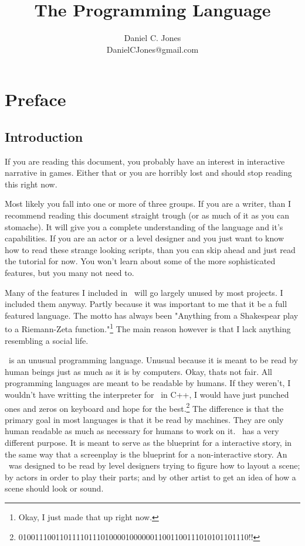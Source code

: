 \documentclass{book}
\title{The \textcolor{TitleRed}{\SSquared} Programming Language}
\author{Daniel C. Jones\\DanielCJones@gmail.com}
\begin{document}
%
%

\maketitle

%
%

\tableofcontents


%
%

\chapter{Preface}


\section{Introduction}
If you are reading this document, you probably have an interest in
interactive narrative in games.  Either that or you are horribly lost and should stop reading this right now.  

Most likely you fall into one or more of three groups.  If you are a writer, than I recommend reading this document straight trough (or as much of it as you can stomache). It will give you a complete understanding of the language and it's capabilities.  If you are an actor or a level designer and you just want to know how to read these strange looking scripts, than you can skip ahead and just read the tutorial for now.  You won't learn about some of the more sophisticated features, but you many not need to.

Many of the features I included in \SSquared\ will go largely unused by most projects.  I included them anyway.  Partly because it was important to me that it be a full featured language.  The motto has always been "Anything from a Shakespear play to a Riemann-Zeta function."\footnote{Okay, I just made that up right now.}  The main reason however is that I lack anything resembling a social life.

\SSquared\ is an unusual programming language.  Unusual because it is meant to be read by human beings just as much as it is by computers.  Okay, thats not fair.  All programming languages are meant to be readable by humans. If they weren't, I wouldn't have writting the interpreter for \SSquared\ in C++, I would have just punched ones and zeros on keyboard and hope for the best.\footnote{01001110011011110111010000100000011001100111010101101110!!} The difference is that the primary goal in most languages is that it be read by machines.  They are only human readable as much as necessary for humans to work on it.  \SSquared\ has a very different purpose.  It is meant to serve as the blueprint for a interactive story, in the same way that a screenplay is the blueprint for a non-interactive story.  An \SSquared\ was designed to be read by level designers trying to figure how to layout a scene; by actors in order to play their parts; and by other artist to get an idea of how a scene should look or sound.
\end{document}
